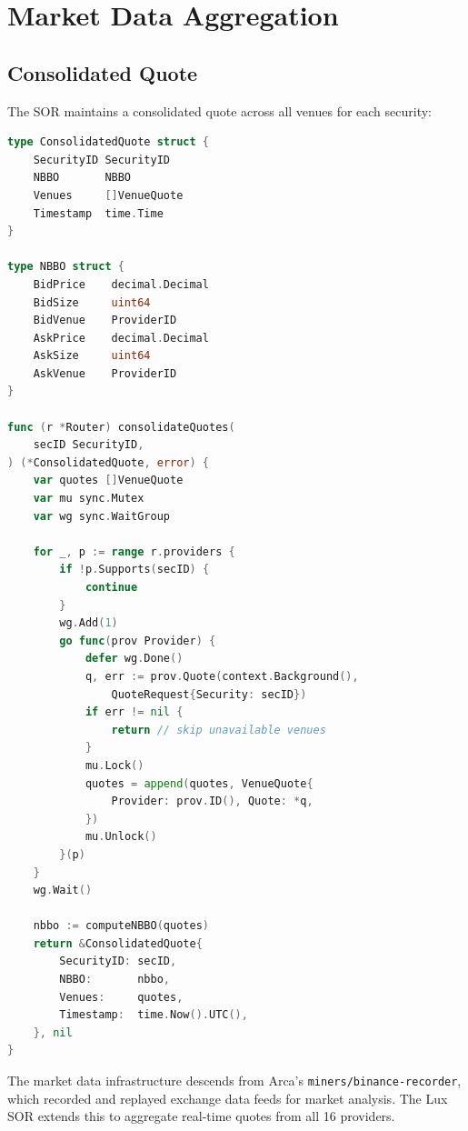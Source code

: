 \section{Market Data Aggregation}
\label{sec:marketdata}

\subsection{Consolidated Quote}

The SOR maintains a consolidated quote across all venues for each security:

\begin{lstlisting}[language=Go,caption={Consolidated quote aggregation.}]
type ConsolidatedQuote struct {
    SecurityID SecurityID
    NBBO       NBBO
    Venues     []VenueQuote
    Timestamp  time.Time
}

type NBBO struct {
    BidPrice    decimal.Decimal
    BidSize     uint64
    BidVenue    ProviderID
    AskPrice    decimal.Decimal
    AskSize     uint64
    AskVenue    ProviderID
}

func (r *Router) consolidateQuotes(
    secID SecurityID,
) (*ConsolidatedQuote, error) {
    var quotes []VenueQuote
    var mu sync.Mutex
    var wg sync.WaitGroup

    for _, p := range r.providers {
        if !p.Supports(secID) {
            continue
        }
        wg.Add(1)
        go func(prov Provider) {
            defer wg.Done()
            q, err := prov.Quote(context.Background(),
                QuoteRequest{Security: secID})
            if err != nil {
                return // skip unavailable venues
            }
            mu.Lock()
            quotes = append(quotes, VenueQuote{
                Provider: prov.ID(), Quote: *q,
            })
            mu.Unlock()
        }(p)
    }
    wg.Wait()

    nbbo := computeNBBO(quotes)
    return &ConsolidatedQuote{
        SecurityID: secID,
        NBBO:       nbbo,
        Venues:     quotes,
        Timestamp:  time.Now().UTC(),
    }, nil
}
\end{lstlisting}

The market data infrastructure descends from Arca's \texttt{miners/binance-recorder}, which recorded and replayed exchange data feeds for market analysis. The Lux SOR extends this to aggregate real-time quotes from all 16 providers.

